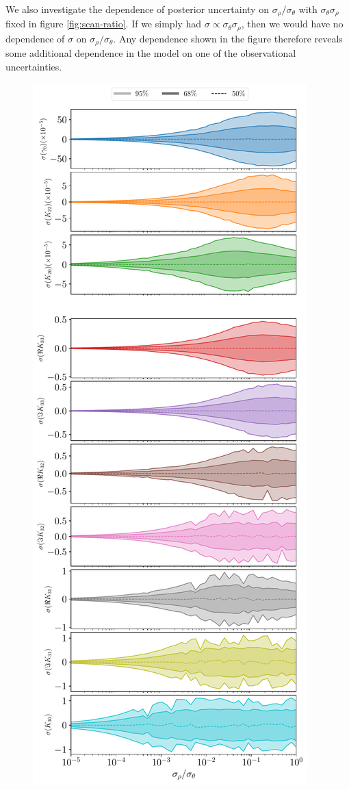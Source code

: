 \documentclass[fleqn,usenatbib]{mnras}
\begin{document}
We also investigate the dependence of posterior uncertainty on $\sigma_\rho / \sigma_\theta$ with $\sigma_\theta \sigma_\rho$ fixed in figure \ref{fig:scan-ratio}. If we simply had $\sigma \propto \sigma_\theta \sigma_\rho$, then we would have no dependence of $\sigma$ on $\sigma_\rho / \sigma_\theta$. Any dependence shown in the figure therefore reveals some additional dependence in the model on one of the observational uncertainties.

\begin{figure}
  \centering
  \includegraphics[height=0.89\textheight]{figs/scan-ratio.pdf}

\end{figure}
\end{document}
